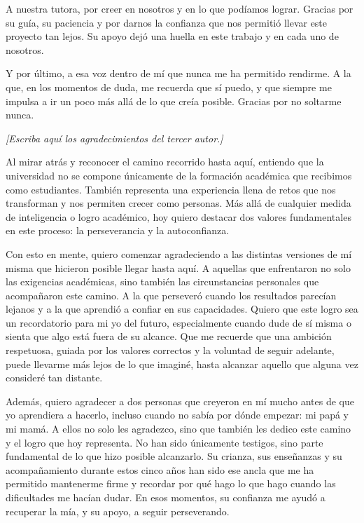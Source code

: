 \documentclass[12pt,letterpaper,oneside]{article}
\newcommand{\autorTres}{Sebastián Almanza Galvis}
\newcommand{\autorCuatro}{Xiomara Herrera Suárez}
\newcommand{\pendiente}[1][Escriba aquí el contenido de esta sección.]{%
  {\color{gray!75}\itshape [#1]}\par}
\begin{document}
A nuestra tutora, por creer en nosotros y en lo que podíamos lograr. Gracias por su guía, su paciencia y por darnos la confianza que nos permitió llevar este proyecto tan lejos. Su apoyo dejó una huella en este trabajo y en cada uno de nosotros.

Y por último, a esa voz dentro de mí que nunca me ha permitido rendirme. A la que, en los momentos de duda, me recuerda que sí puedo, y que siempre me impulsa a ir un poco más allá de lo que creía posible. Gracias por no soltarme nunca.

\vspace{1cm}
\noindent{\bfseries \autorTres:}
\vspace{0.3cm}

\pendiente[Escriba aquí los agradecimientos del tercer autor.]

\vspace{1cm}
\noindent{\bfseries \autorCuatro:}
\vspace{0.3cm}

Al mirar atrás y reconocer el camino recorrido hasta aquí, entiendo que la universidad no se compone únicamente de la formación académica que recibimos como estudiantes. También representa una experiencia llena de retos que nos transforman y nos permiten crecer como personas. Más allá de cualquier medida de inteligencia o logro académico, hoy quiero destacar dos valores fundamentales en este proceso: la perseverancia y la autoconfianza.

Con esto en mente, quiero comenzar agradeciendo a las distintas versiones de mí misma que hicieron posible llegar hasta aquí. A aquellas que enfrentaron no solo las exigencias académicas, sino también las circunstancias personales que acompañaron este camino. A la que perseveró cuando los resultados parecían lejanos y a la que aprendió a confiar en sus capacidades. Quiero que este logro sea un recordatorio para mi yo del futuro, especialmente cuando dude de sí misma o sienta que algo está fuera de su alcance. Que me recuerde que una ambición respetuosa, guiada por los valores correctos y la voluntad de seguir adelante, puede llevarme más lejos de lo que imaginé, hasta alcanzar aquello que alguna vez consideré tan distante.

Además, quiero agradecer a dos personas que creyeron en mí mucho antes de que yo aprendiera a hacerlo, incluso cuando no sabía por dónde empezar: mi papá y mi mamá. A ellos no solo les agradezco, sino que también les dedico este camino y el logro que hoy representa. No han sido únicamente testigos, sino parte fundamental de lo que hizo posible alcanzarlo. Su crianza, sus enseñanzas y su acompañamiento durante estos cinco años han sido ese ancla que me ha permitido mantenerme firme y recordar por qué hago lo que hago cuando las dificultades me hacían dudar. En esos momentos, su confianza me ayudó a recuperar la mía, y su apoyo, a seguir perseverando.
\end{document}
